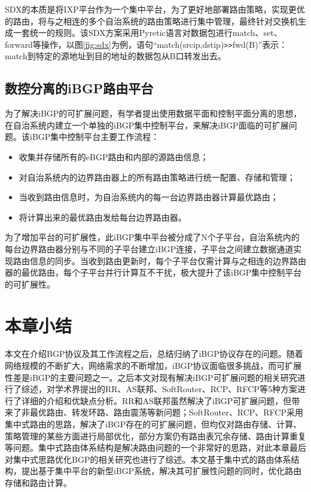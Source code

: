 SDX的本质是将IXP平台作为一个集中平台，为了更好地部署路由策略，实现更优的路由，将与之相连的多个自治系统的路由策略进行集中管理，最终针对交换机生成一套统一的规则。该SDX方案采用Pyretic\cite{monsanto2013}语言对数据包进行match、set、forward等操作，以图\ref{fig:sdx}为例，语句“match(srcip,dstip)\verb+>>+fwd(B)”表示：match到特定的源地址到目的地址的数据包从B口转发出去。

\subsection{数控分离的iBGP路由平台}
为了解决iBGP的可扩展问题，有学者提出使用数据平面和控制平面分离的思想，在自治系统内建立一个单独的iBGP集中控制平台\cite{Oprescu2011Rethinking}，来解决iBGP面临的可扩展问题。该iBGP集中控制平台主要工作流程：
\begin{itemize}
  \item 收集并存储所有的eBGP路由和内部的源路由信息；
  \item 对自治系统内的边界路由器上的所有路由策略进行统一配置、存储和管理；
  \item 当收到路由信息时，为自治系统内的每一台边界路由器计算最优路由；
  \item 将计算出来的最优路由发给每台边界路由器。
\end{itemize}

为了增加平台的可扩展性，此iBGP集中平台被分成了N个子平台，自治系统内的每台边界路由器分别与不同的子平台建立iBGP连接，子平台之间建立数据通道实现路由信息的同步。当收到路由更新时，每个子平台仅需计算与之相连的边界路由器的最优路由，每个子平台并行计算互不干扰，极大提升了该iBGP集中控制平台的可扩展性。


\section{本章小结}

本文在介绍BGP协议及其工作流程之后，总结归纳了iBGP协议存在的问题。随着网络规模的不断扩大，网络需求的不断增加，iBGP协议面临很多挑战，而可扩展性差是iBGP的主要问题之一。之后本文对现有解决iBGP可扩展问题的相关研究进行了综述，对学术界提出的RR、AS联邦、SoftRouter、RCP、RFCP等5种方案进行了详细的介绍和优缺点分析。RR和AS联邦虽然解决了iBGP可扩展问题，但带来了非最优路由、转发环路、路由震荡等新问题；SoftRouter、RCP、RFCP采用集中式路由的思路，解决了iBGP存在的可扩展问题，但均仅对路由存储、计算、策略管理的某些方面进行局部优化，部分方案仍有路由表冗余存储、路由计算重复等问题。集中式路由体系结构是解决路由问题的一个非常好的思路，对此本章最后对集中式思路优化BGP的相关研究也进行了综述。本文基于集中式的路由体系结构，提出基于集中平台的新型iBGP系统，解决其可扩展性问题的同时，优化路由存储和路由计算。
